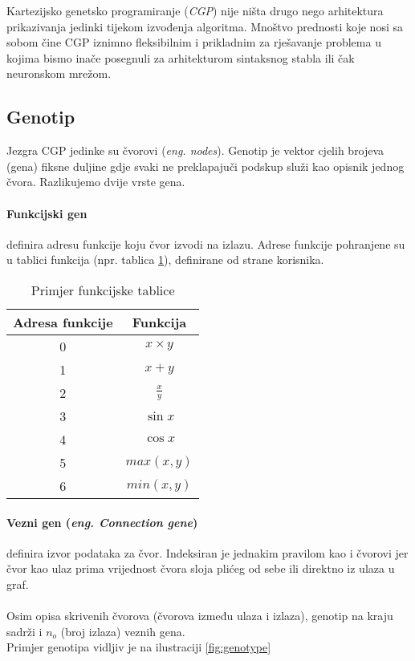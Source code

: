 Kartezijsko genetsko programiranje (\emph{CGP}) nije ništa drugo nego arhitektura prikazivanja jedinki tijekom izvođenja algoritma. 
Mnoštvo prednosti koje nosi sa sobom čine CGP iznimno fleksibilnim i prikladnim za rješavanje problema u kojima bismo inače posegnuli za arhitekturom sintaksnog stabla ili čak neuronskom mrežom.

\subsection{Genotip}
Jezgra CGP jedinke su čvorovi (\emph{eng. nodes}).
Genotip je vektor cjelih brojeva (gena) fiksne duljine gdje svaki ne preklapajuči podskup služi kao opisnik jednog čvora.
Razlikujemo dvije vrste gena.

\paragraph{Funkcijski gen}
definira adresu funkcije koju čvor izvodi na izlazu.
Adrese funkcije pohranjene su u tablici funkcija (npr. tablica \ref{table:function_table}), definirane od strane korisnika.

\begin{table}
	\centering
	\begin{tabular}{||c c||}
		\hline
		Adresa funkcije & Funkcija \\ [0.5ex]
		\hline\hline
		0 & $x \times y$ \\
		1 & $x + y$ \\
		2 & $\frac{x}{y}$ \\
		3 & $\sin{x}$ \\
		4 & $\cos{x}$ \\ 
		5 & $max(x, y)$ \\
		6 & $min(x, y)$ \\ [1ex]
		\hline
	\end{tabular}
	\caption{Primjer funkcijske tablice}
	\label{table:function_table}
\end{table}

\paragraph{Vezni gen (\emph{eng. Connection gene})}
definira izvor podataka za čvor.
Indeksiran je jednakim pravilom kao i čvorovi jer čvor kao ulaz prima vrijednost čvora sloja plićeg od sebe ili direktno iz ulaza u graf. \\
\\
Osim opisa skrivenih čvorova (čvorova između ulaza i izlaza), genotip na kraju sadrži i $n_o$ (broj izlaza) veznih gena. \\
Primjer genotipa vidljiv je na ilustraciji \ref{fig:genotype}

